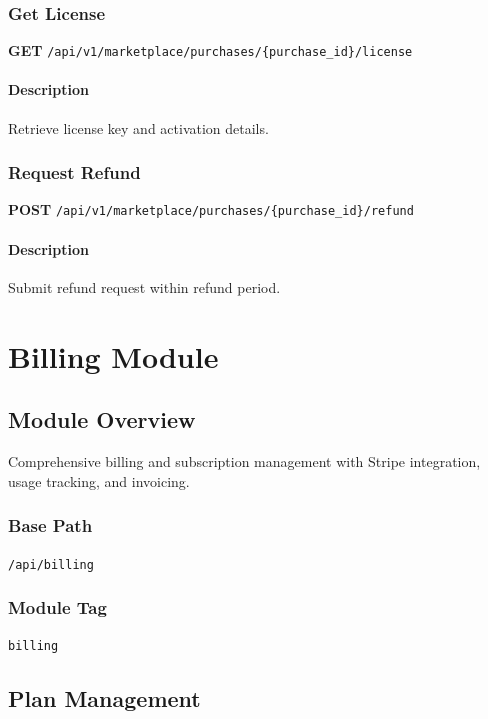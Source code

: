 \documentclass[11pt,a4paper]{report}
\begin{document}
\subsection{Get License}

\textbf{GET} \texttt{/api/v1/marketplace/purchases/\{purchase\_id\}/license}

\subsubsection{Description}
Retrieve license key and activation details.

\subsection{Request Refund}

\textbf{POST} \texttt{/api/v1/marketplace/purchases/\{purchase\_id\}/refund}

\subsubsection{Description}
Submit refund request within refund period.

\newpage

\chapter{Billing Module}

\section{Module Overview}

Comprehensive billing and subscription management with Stripe integration, usage tracking, and invoicing.

\subsection{Base Path}
\texttt{/api/billing}

\subsection{Module Tag}
\texttt{billing}

\section{Plan Management}
\end{document}

